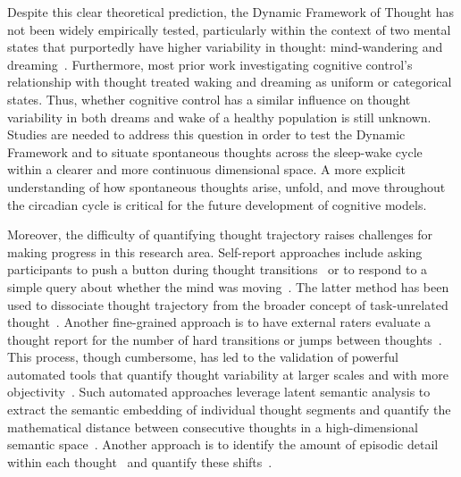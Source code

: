 \documentclass[10pt,a4paper,twocolumn]{article}
\begin{document}
\par
Despite this clear theoretical prediction, the Dynamic Framework of Thought has not been widely empirically tested, particularly within the context of two mental states that purportedly have higher variability in thought: mind-wandering and dreaming~\cite{christoff2016}. Furthermore, most prior work investigating cognitive control's relationship with thought treated waking and dreaming as uniform or categorical states. Thus, whether cognitive control has a similar influence on thought variability in both dreams and wake of a healthy population is still unknown. Studies are needed to address this question in order to test the Dynamic Framework and to situate spontaneous thoughts across the sleep-wake cycle within a clearer and more continuous dimensional space. A more explicit understanding of how spontaneous thoughts arise, unfold, and move throughout the circadian cycle is critical for the future development of cognitive models.

\par
Moreover, the difficulty of quantifying thought trajectory raises challenges for making progress in this research area. Self-report approaches include asking participants to push a button during thought transitions~\cite{li2021} or to respond to a simple query about whether the mind was moving~\cite{alperin2021,brosowsky2021,gross2021,kam2021,mills2021,mills2018a}. The latter method has been used to dissociate thought trajectory from the broader concept of task-unrelated thought~\cite{brosowsky2021,mills2018a}. Another fine-grained approach is to have external raters evaluate a thought report for the number of hard transitions or jumps between thoughts~\cite{li2021,raffaelli2021,sripada2020}. This process, though cumbersome, has led to the validation of powerful automated tools that quantify thought variability at larger scales and with more objectivity~\cite{li2021,sripada2020}. Such automated approaches leverage latent semantic analysis to extract the semantic embedding of individual thought segments and quantify the mathematical distance between consecutive thoughts in a high-dimensional semantic space~\cite{li2021,li2023}. Another approach is to identify the amount of episodic detail within each thought~\cite{vangenugten2024} and quantify these shifts~\cite{mildner2024}.
\end{document}
